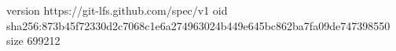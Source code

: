 version https://git-lfs.github.com/spec/v1
oid sha256:873b45f72330d2c7068c1e6a274963024b449e645bc862ba7fa09de747398550
size 699212
